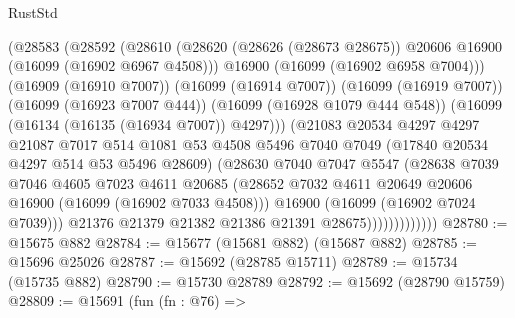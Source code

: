 \begin{lexlean}{RustStd}
\begin{coremodule}
                        (@28583
                          (@28592
                            (@28610
                              (@28620
                                (@28626 (@28673 @28675))
                                @20606
                                @16900
                                (@16099 (@16902 @6967 @4508)))
                              @16900
                              (@16099 (@16902 @6958 @7004)))
                            (@16909 (@16910 @7007))
                            (@16099 (@16914 @7007))
                            (@16099 (@16919 @7007))
                            (@16099 (@16923 @7007 @444))
                            (@16099 (@16928 @1079 @444 @548))
                            (@16099 (@16134 (@16135 (@16934 @7007)) @4297)))
                          (@21083
                            @20534
                            @4297
                            @4297
                            @21087
                            @7017
                            @514
                            @1081
                            @53
                            @4508
                            @5496
                            @7040
                            @7049
                            (@17840 @20534 @4297 @514 @53 @5496 @28609)
                            (@28630
                              @7040
                              @7047
                              @5547
                              (@28638
                                @7039
                                @7046
                                @4605
                                @7023
                                @4611
                                @20685
                                (@28652
                                  @7032
                                  @4611
                                  @20649
                                  @20606
                                  @16900
                                  (@16099 (@16902 @7033 @4508)))
                                @16900
                                (@16099 (@16902 @7024 @7039)))
                              @21376
                              @21379
                              @21382
                              @21386
                              @21391
                              @28675)))))))))))))
@28780 := @15675 @882
@28784 := @15677 (@15681 @882) (@15687 @882)
@28785 := @15696 @25026
@28787 := @15692 (@28785 @15711)
@28789 := @15734 (@15735 @882)
@28790 := @15730 @28789
@28792 := @15692 (@28790 @15759)
@28809 := @15691
    (fun (fn : @76) =>

\end{coremodule}
\end{lexlean}
